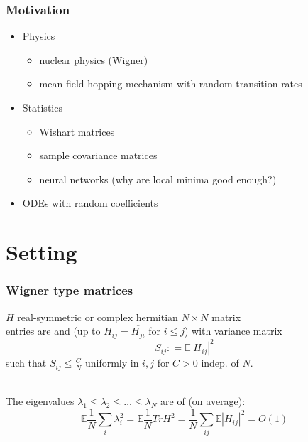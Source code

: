 \documentclass{beamer}
\numberwithin{equation}{section}
\newcommand{\deq}{\mathrel{\mathop:}=}
\newcommand{\E}{{\mathbb E }}
\renewcommand{\P}{{\mathbb P}}
\newcommand{\Cr}{\color{red}}
\renewcommand{\emph}[1]{{\Cr{#1}}}
\begin{document}
\begin{frame}
\frametitle{Motivation}
\begin{itemize}
	\item Physics
	\begin{itemize}
		\item nuclear physics (Wigner)
		\item mean field hopping mechanism with random transition rates
	\end{itemize}
	\item Statistics
	\begin{itemize}
		\item Wishart matrices
		\item sample covariance matrices
		\item neural networks (why are local minima good enough?)
	\end{itemize}
	\item ODEs with random coefficients
\end{itemize}
\end{frame}

\section{Setting}

\begin{frame}
\frametitle{Wigner type matrices}
$H$ real-symmetric or complex hermitian $N\times N$ matrix\\
entries are \emph{centered} and \emph{independent} (up to $H_{ij}=\overline{H_{ji}}$ for $i\leq j$) with variance matrix $$S_{ij}\deq \E|H_{ij}|^2$$
such that $S_{ij}\leq\frac{C}{N}$ uniformly in $i,j$ for $C>0$ indep. of $N$.\\~


The eigenvalues $\lambda_1\leq \lambda_2\leq \dots\leq \lambda_N$ are of \emph{order one} (on average):
$$\E\frac{1}{N}\sum_i\lambda_i^2 = \E\frac{1}{N}Tr H^2 = \frac{1}{N}\sum_{ij}\E |H_{ij}|^2 = O(1)$$
\end{frame}
\end{document}
